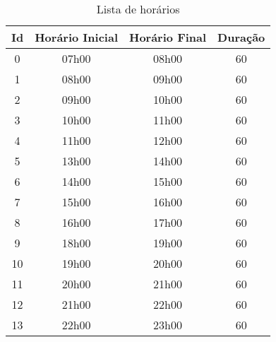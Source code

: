 \begin{apendices}
\begin{table}[H]
\footnotesize
\centering
\begin{tabular}{|c|c|c|c|}
\hline
\textbf{Id} & \textbf{Horário Inicial} & \textbf{Horário Final} & \textbf{Duração} \\ \hline
0 & 07h00 & 08h00 & 60 \\ \hline
1 & 08h00 & 09h00 & 60 \\ \hline
2 & 09h00 & 10h00 & 60 \\ \hline
3 & 10h00 & 11h00 & 60 \\ \hline
4 & 11h00 & 12h00 & 60 \\ \hline
5 & 13h00 & 14h00 & 60 \\ \hline
6 & 14h00 & 15h00 & 60 \\ \hline
7 & 15h00 & 16h00 & 60 \\ \hline
8 & 16h00 & 17h00 & 60 \\ \hline
9 & 18h00 & 19h00 & 60 \\ \hline
10 & 19h00 & 20h00 & 60 \\ \hline
11 & 20h00 & 21h00 & 60 \\ \hline
12 & 21h00 & 22h00 & 60 \\ \hline
13 & 22h00 & 23h00 & 60 \\ \hline
\end{tabular}
\caption{Lista de horários}
\label{ap-lista-horarios}
\end{table}


\end{apendices}
